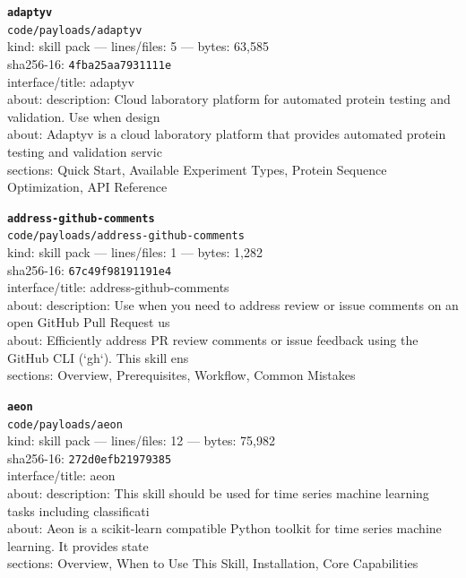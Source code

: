 \noindent\textbf{\texttt{adaptyv}}\\
\texttt{code/payloads/adaptyv}\\
kind: skill pack --- lines/files: 5 --- bytes: 63,585\\
sha256-16: \texttt{4fba25aa7931111e}\\
interface/title: adaptyv\\
about: description: Cloud laboratory platform for automated protein testing and validation. Use when design\\
about: Adaptyv is a cloud laboratory platform that provides automated protein testing and validation servic\\
sections: Quick Start, Available Experiment Types, Protein Sequence Optimization, API Reference\\
\vspace*{6.0pt}

\noindent\textbf{\texttt{address-github-comments}}\\
\texttt{code/payloads/address-github-comments}\\
kind: skill pack --- lines/files: 1 --- bytes: 1,282\\
sha256-16: \texttt{67c49f98191191e4}\\
interface/title: address-github-comments\\
about: description: Use when you need to address review or issue comments on an open GitHub Pull Request us\\
about: Efficiently address PR review comments or issue feedback using the GitHub CLI (`gh`). This skill ens\\
sections: Overview, Prerequisites, Workflow, Common Mistakes\\
\vspace*{6.0pt}

\noindent\textbf{\texttt{aeon}}\\
\texttt{code/payloads/aeon}\\
kind: skill pack --- lines/files: 12 --- bytes: 75,982\\
sha256-16: \texttt{272d0efb21979385}\\
interface/title: aeon\\
about: description: This skill should be used for time series machine learning tasks including classificati\\
about: Aeon is a scikit-learn compatible Python toolkit for time series machine learning. It provides state\\
sections: Overview, When to Use This Skill, Installation, Core Capabilities\\
\vspace*{6.0pt}

